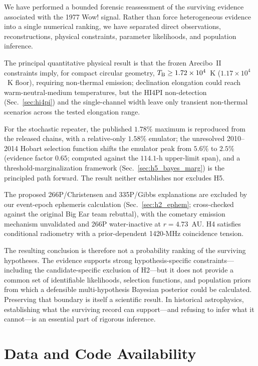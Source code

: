 \documentclass[twocolumn]{aastex701}
\newcommand{\tbeq}{T_{\rm B}}
\begin{document}
We have performed a bounded forensic reassessment of the surviving evidence associated with the 1977 Wow! signal. Rather than force heterogeneous evidence into a single numerical ranking, we have separated direct observations, reconstructions, physical constraints, parameter likelihoods, and population inference.

The principal quantitative physical result is that the frozen Arecibo~II constraints imply, for compact circular geometry, $\tbeq\geq1.72\times10^4$~K ($1.17\times10^4$~K floor), requiring non-thermal  emission; declination elongation could reach warm-neutral-medium temperatures, but the HI4PI non-detection (Sec.~\ref{sec:hi4pi}) and the single-channel width leave only transient non-thermal scenarios across the tested elongation range.

For the stochastic repeater, the published $1.78\%$ maximum is reproduced from the released chains, with a relative-only $1.58\%$ emulator; the unresolved 2010--2014 Hobart selection function shifts the emulator peak from $5.6\%$ to $2.5\%$ (evidence factor $0.65$; computed against the $114.1$-h upper-limit span), and a threshold-marginalization framework (Sec.~\ref{sec:h5_bayes_marg}) is the principled path forward. The result neither establishes nor excludes H5.

The proposed 266P/Christensen and 335P/Gibbs explanations are excluded by our event-epoch ephemeris calculation (Sec.~\ref{sec:h2_ephem}; cross-checked against the original Big Ear team rebuttal), with the cometary emission mechanism unvalidated and 266P water-inactive at $r=4.73$~AU. H4 satisfies conditional radiometry with a prior-dependent 1420-MHz coincidence tension.

The resulting conclusion is therefore not a probability ranking of the surviving hypotheses. The evidence supports strong hypothesis-specific constraints---including the candidate-specific exclusion of H2---but it does not provide a common set of identifiable likelihoods, selection functions, and population priors from which a defensible multi-hypothesis Bayesian posterior could be calculated. Preserving that boundary is itself a scientific result. In historical astrophysics, establishing what the surviving record can support---and refusing to infer what it cannot---is an essential part of rigorous inference.

\section{Data and Code Availability} \label{sec:availability}
\end{document}
